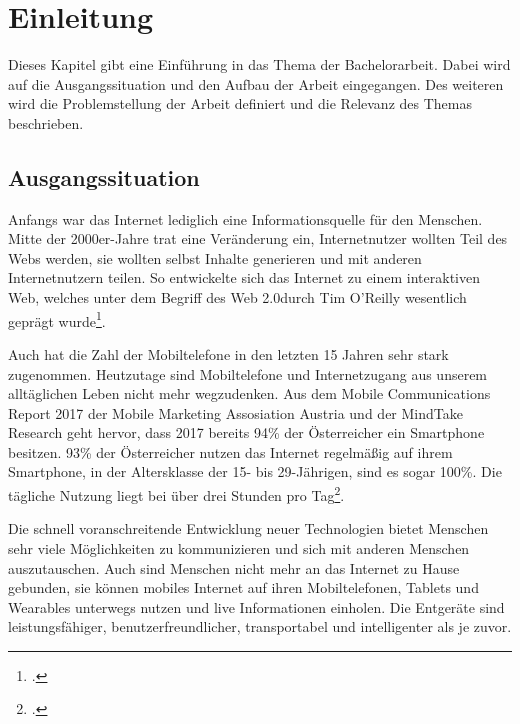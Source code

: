 


\chapter{Einleitung}
\label{ch:Einleitung}
Dieses Kapitel gibt eine Einführung in das Thema der Bachelorarbeit. Dabei wird auf die Ausgangssituation und den Aufbau der Arbeit eingegangen. Des weiteren wird die Problemstellung der Arbeit definiert und die Relevanz des Themas beschrieben.


\section{Ausgangssituation}

Anfangs war das Internet lediglich eine Informationsquelle für den Menschen. Mitte der 2000er-Jahre trat eine Veränderung ein, Internetnutzer wollten Teil des Webs werden, sie wollten selbst Inhalte generieren und mit anderen Internetnutzern teilen. So entwickelte sich das Internet zu einem interaktiven Web, welches unter dem Begriff des \glqq Web 2.0\grqq  durch Tim O'Reilly wesentlich geprägt wurde\footcite{oreilly}.

Auch hat die Zahl der Mobiltelefone in den letzten 15 Jahren sehr stark zugenommen.
Heutzutage sind Mobiltelefone und Internetzugang aus unserem alltäglichen Leben nicht mehr wegzudenken. Aus dem Mobile Communications Report 2017 der Mobile Marketing Assosiation Austria und der MindTake Research geht hervor, dass 2017 bereits 94\% der Österreicher ein Smartphone besitzen. 93\% der Österreicher nutzen das Internet regelmäßig auf ihrem Smartphone, in der Altersklasse der 15- bis 29-Jährigen, sind es sogar 100\%. Die tägliche Nutzung liegt bei über drei Stunden pro Tag\footcite{MMAA}.

Die schnell voranschreitende Entwicklung neuer Technologien bietet Menschen sehr viele Möglichkeiten zu kommunizieren und sich mit anderen Menschen auszutauschen. Auch sind Menschen nicht mehr an das Internet zu Hause gebunden, sie können mobiles Internet auf ihren Mobiltelefonen, Tablets und Wearables unterwegs nutzen und live Informationen einholen. Die Entgeräte sind leistungsfähiger, benutzerfreundlicher, transportabel und intelligenter als je zuvor.

